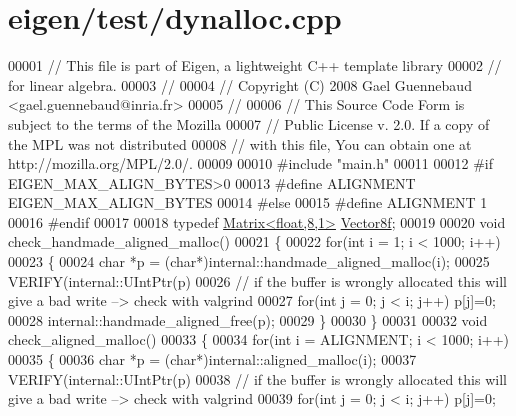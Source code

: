 \hypertarget{eigen_2test_2dynalloc_8cpp_source}{}\section{eigen/test/dynalloc.cpp}
\label{eigen_2test_2dynalloc_8cpp_source}

\begin{DoxyCode}
00001 \textcolor{comment}{// This file is part of Eigen, a lightweight C++ template library}
00002 \textcolor{comment}{// for linear algebra.}
00003 \textcolor{comment}{//}
00004 \textcolor{comment}{// Copyright (C) 2008 Gael Guennebaud <gael.guennebaud@inria.fr>}
00005 \textcolor{comment}{//}
00006 \textcolor{comment}{// This Source Code Form is subject to the terms of the Mozilla}
00007 \textcolor{comment}{// Public License v. 2.0. If a copy of the MPL was not distributed}
00008 \textcolor{comment}{// with this file, You can obtain one at http://mozilla.org/MPL/2.0/.}
00009 
00010 \textcolor{preprocessor}{#include "main.h"}
00011 
00012 \textcolor{preprocessor}{#if EIGEN\_MAX\_ALIGN\_BYTES>0}
00013 \textcolor{preprocessor}{#define ALIGNMENT EIGEN\_MAX\_ALIGN\_BYTES}
00014 \textcolor{preprocessor}{#else}
00015 \textcolor{preprocessor}{#define ALIGNMENT 1}
00016 \textcolor{preprocessor}{#endif}
00017 
00018 \textcolor{keyword}{typedef} \hyperlink{group___core___module}{Matrix<float,8,1>} \hyperlink{group___core___module}{Vector8f};
00019 
00020 \textcolor{keywordtype}{void} check\_handmade\_aligned\_malloc()
00021 \{
00022   \textcolor{keywordflow}{for}(\textcolor{keywordtype}{int} i = 1; i < 1000; i++)
00023   \{
00024     \textcolor{keywordtype}{char} *p = (\textcolor{keywordtype}{char}*)internal::handmade\_aligned\_malloc(i);
00025     VERIFY(internal::UIntPtr(p)%
00026     \textcolor{comment}{// if the buffer is wrongly allocated this will give a bad write --> check with valgrind}
00027     \textcolor{keywordflow}{for}(\textcolor{keywordtype}{int} j = 0; j < i; j++) p[j]=0;
00028     internal::handmade\_aligned\_free(p);
00029   \}
00030 \}
00031 
00032 \textcolor{keywordtype}{void} check\_aligned\_malloc()
00033 \{
00034   \textcolor{keywordflow}{for}(\textcolor{keywordtype}{int} i = ALIGNMENT; i < 1000; i++)
00035   \{
00036     \textcolor{keywordtype}{char} *p = (\textcolor{keywordtype}{char}*)internal::aligned\_malloc(i);
00037     VERIFY(internal::UIntPtr(p)%
00038     \textcolor{comment}{// if the buffer is wrongly allocated this will give a bad write --> check with valgrind}
00039     \textcolor{keywordflow}{for}(\textcolor{keywordtype}{int} j = 0; j < i; j++) p[j]=0;

\end{DoxyCode}
